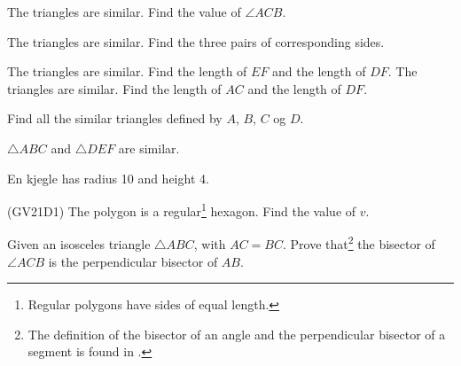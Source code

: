 




	
\opgt

The triangles are similar. Find the value of $ \angle ACB $. \vs
{}

The triangles are similar. Find the three pairs of corresponding sides.

The triangles are similar. Find the length of $ EF $ and the length of $ DF $.
\newpage
{}
The triangles are similar. Find the length of $ AC $ and the length of $ DF $.

Find all the similar triangles defined by $ A $, $ B $, $ C $ og $ D $.

$ \triangle ABC $ and $ \triangle DEF $ are similar.

\newpage
{}
En kjegle has radius 10 and height 4.

 \vs
{}

\newpage

(GV21D1) \os
The polygon is a regular\footnote{Regular polygons have sides of equal length.} hexagon. Find the value of $  v $.

Given an isosceles triangle $\triangle {ABC} $, with $ AC=BC $. Prove that\footnote{The definition of the bisector of an angle and the perpendicular bisector of a segment is found in \tmen.} the bisector of $ \angle ACB $ is the perpendicular bisector of $ AB $.

